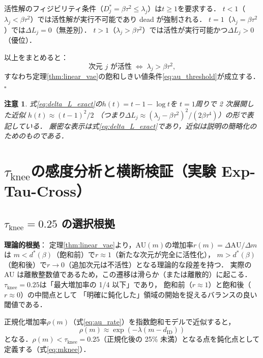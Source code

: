 \documentclass[11pt,a4paper]{jsarticle}
\newtheorem{remark}{注意}
\newcommand{\dID}{d_{\mathrm{ID}}}
\begin{document}
活性解のフィジビリティ条件（$D_j^* = \beta\tau^2 \leq \lambda_j$）は$t \geq 1$を要求する．
$t < 1$（$\lambda_j < \beta\tau^2$）では活性解が実行不可能であり dead が強制される．
$t = 1$（$\lambda_j = \beta\tau^2$）では$\Delta L_j = 0$（無差別）．
$t > 1$（$\lambda_j > \beta\tau^2$）では活性が実行可能かつ$\Delta L_j > 0$（優位）．

以上をまとめると：
\begin{equation}
  \text{次元 }j\text{ が活性} \;\Longleftrightarrow\; \lambda_j > \beta\tau^2,
\end{equation}
すなわち定理\ref{thm:linear_vae}の飽和しきい値条件\eqref{eq:au_threshold}が成立する．\hfill$\square$

\begin{remark}
式\eqref{eq:delta_L_exact}の$h(t) = t - 1 - \log t$を
$t = 1$周りで 2 次展開した近似
$h(t) \approx (t-1)^2/2$
（つまり$\Delta L_j \approx (\lambda_j - \beta\tau^2)^2/(2\beta\tau^4)$）の形で表記している．
厳密な表示は式\eqref{eq:delta_L_exact}であり，近似は説明の簡略化のためのものである．
\end{remark}

\section{$\tau_{\mathrm{knee}}$の感度分析と横断検証（実験 Exp-Tau-Cross）}\label{app:tau_knee}

\subsection*{$\tau_{\mathrm{knee}} = 0.25$ の選択根拠}

\textbf{理論的根拠}：
定理\ref{thm:linear_vae}より，AU$(m)$の増加率$r(m) = \Delta\mathrm{AU}/\Delta m$は
$m < d^*(\beta)$（飽和前）で$r \approx 1$（新たな次元が完全に活性化），
$m > d^*(\beta)$（飽和後）で$r \to 0$（追加次元は不活性）となる理論的な段差を持つ．
実際の AU は離散整数値であるため，この遷移は滑らか（または離散的）に起こる．
$\tau_{\mathrm{knee}} = 0.25$は「最大増加率の 1/4 以下」であり，
飽和前（$r \approx 1$）と飽和後（$r \approx 0$）の中間点として
「明確に鈍化した」領域の開始を捉えるバランスの良い閾値である．

正規化増加率$\rho(m)$（式\eqref{eq:au_rate}）を指数飽和モデルで近似すると，
\begin{equation}
  \rho(m) \approx \exp(-\lambda (m - \dID))
  \label{eq:knee_curvature}
\end{equation}
となる．$\rho(m) < \tau_{\mathrm{knee}} = 0.25$（正規化後の 25\% 未満）となる点を鈍化点として定義する（式\eqref{eq:mknee}）．
\end{document}
